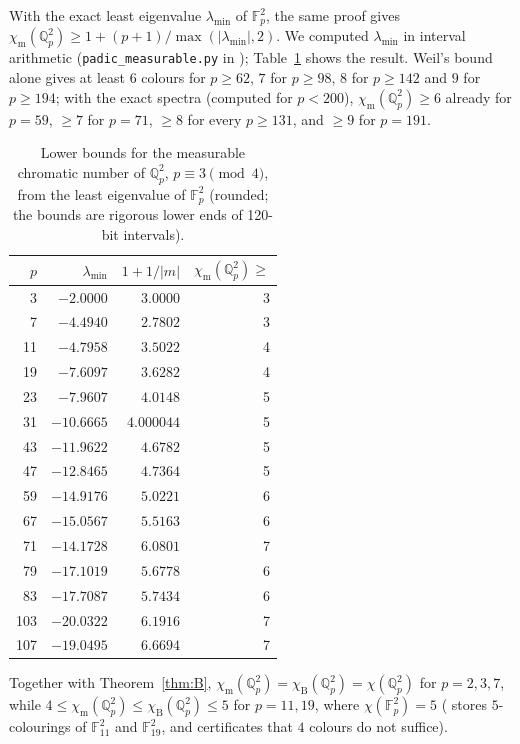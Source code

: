 \documentclass[11pt,a4paper]{amsart}
\theoremstyle{remark}
\newcommand{\F}{\mathbb{F}}
\newcommand{\Q}{\mathbb{Q}}
\newcommand{\chiB}{\chi_{\mathrm{B}}}
\newcommand{\chiM}{\chi_{\mathrm{m}}}
\begin{document}
With the exact least eigenvalue $\lambda_{\min}$ of $\F_p^2$, the same proof gives
$\chiM(\Q_p^2)\ge1+(p+1)/\max(|\lambda_{\min}|,2)$. We computed $\lambda_{\min}$ in interval arithmetic
(\texttt{padic\_measurable.py} in \cite{Repo}); Table~\ref{tab:meas} shows the result. Weil's bound alone gives
at least $6$ colours for $p\ge62$, $7$ for $p\ge98$, $8$ for $p\ge142$ and $9$ for $p\ge194$; with the exact
spectra (computed for $p<200$), $\chiM(\Q_p^2)\ge6$ already for $p=59$, $\ge7$ for $p=71$, $\ge8$ for every
$p\ge131$, and $\ge9$ for $p=191$.

\begin{table}[ht]
\centering
\begin{tabular}{rrrr}
$p$ & $\lambda_{\min}$ & $1+1/|m|$ & $\chiM(\Q_p^2)\ge$\\\hline
3 & $-2.0000$ & $3.0000$ & 3\\
7 & $-4.4940$ & $2.7802$ & 3\\
11 & $-4.7958$ & $3.5022$ & 4\\
19 & $-7.6097$ & $3.6282$ & 4\\
23 & $-7.9607$ & $4.0148$ & 5\\
31 & $-10.6665$ & $4.000044$ & 5\\
43 & $-11.9622$ & $4.6782$ & 5\\
47 & $-12.8465$ & $4.7364$ & 5\\
59 & $-14.9176$ & $5.0221$ & 6\\
67 & $-15.0567$ & $5.5163$ & 6\\
71 & $-14.1728$ & $6.0801$ & 7\\
79 & $-17.1019$ & $5.6778$ & 6\\
83 & $-17.7087$ & $5.7434$ & 6\\
103 & $-20.0322$ & $6.1916$ & 7\\
107 & $-19.0495$ & $6.6694$ & 7\\
\end{tabular}
\caption{Lower bounds for the measurable chromatic number of $\Q_p^2$, $p\equiv3\pmod4$, from the least eigenvalue
of $\F_p^2$ (rounded; the bounds are rigorous lower ends of 120-bit intervals).}
\label{tab:meas}
\end{table}

Together with Theorem~\ref{thm:B}, $\chiM(\Q_p^2)=\chiB(\Q_p^2)=\chi(\Q_p^2)$ for $p=2,3,7$, while
$4\le\chiM(\Q_p^2)\le\chiB(\Q_p^2)\le5$ for $p=11,19$, where $\chi(\F_p^2)=5$ (\cite{Repo} stores $5$-colourings of
$\F_{11}^2$ and $\F_{19}^2$, and certificates that $4$ colours do not suffice).
\end{document}
